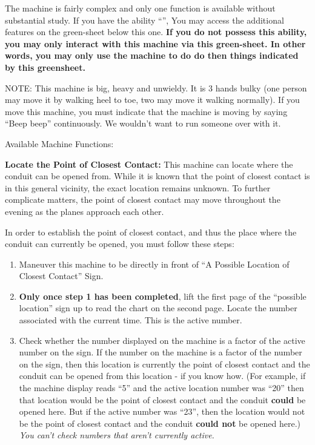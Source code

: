 \documentclass[green]{elementals}
\begin{document}
\name{\gConduitCover{}}


The machine is fairly complex and only one function is available without substantial study. If you have the ability ``\aWorkConduit{}'', You may access the additional features on the green-sheet below this one. {\bf If you do not possess this ability, you may only interact with this machine via this green-sheet. In other words, you may only use the machine to do do then things indicated by this greensheet.}

NOTE: This machine is big, heavy and unwieldy. It is 3 hands bulky (one person may move it by walking heel to toe, two may move it walking normally). If you move this machine, you must indicate that the machine is moving by saying ``Beep beep'' continuously. We wouldn't want to run someone over with it.


{\large Available Machine Functions:}


{\bf Locate the Point of Closest Contact:}
This machine can locate where the conduit can be opened from. While it is known that the point of closest contact is in this general vicinity, the exact location remains unknown. To further complicate matters, the point of closest contact may move throughout the evening as the planes approach each other.

In order to establish the point of closest contact, and thus the place where the conduit can currently be opened, you must follow these steps:
\begin{enumerate}
  \item Maneuver this machine to be directly in front of ``A Possible Location of Closest Contact'' Sign.
  \item {\bf Only once step 1 has been completed}, lift the first page of the ``possible location'' sign up to read the chart on the second page. Locate the number associated with the current time. This is the active number.
  \item Check whether the number displayed on the machine is a factor of the active number on the sign. If the number on the machine is a factor of the number on the sign, then this location is currently the point of closest contact and the conduit can be opened from this location - if you know how. (For example, if the machine display reads ``5'' and the active location number was ``20'' then that location would be the point of closest contact and the conduit {\bf could} be opened here. But if the active number was ``23'', then the location would not be the point of closest contact and the conduit {\bf could not} be opened here.) \emph{You can't check numbers that aren't currently active.} 
\end{enumerate}
\end{document}
